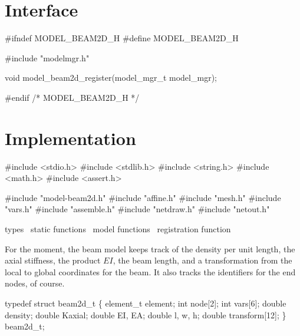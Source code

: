 \section{Interface}

\endmoddef
#ifndef MODEL_BEAM2D_H
#define MODEL_BEAM2D_H

#include "modelmgr.h"

void model_beam2d_register(model_mgr_t model_mgr);

#endif /* MODEL_BEAM2D_H */
\nwendcode{}\nwdocspar


\section{Implementation}

\nwenddocs{}\endmoddef
#include <stdio.h>
#include <stdlib.h>
#include <string.h>
#include <math.h>
#include <assert.h>

#include "model-beam2d.h"
#include "affine.h"
#include "mesh.h"
#include "vars.h"
#include "assemble.h"
#include "netdraw.h"
#include "netout.h"

\LA{}types~{\nwtagstyle{}}\RA{}
\LA{}static functions~{\nwtagstyle{}}\RA{}
\LA{}model functions~{\nwtagstyle{}}\RA{}
\LA{}registration function~{\nwtagstyle{}}\RA{}
\nwendcode{}\nwdocspar


For the moment, the beam model keeps track of the density per unit length,
the axial stiffness, the product $EI$, the beam length, and a transformation
from the local to global coordinates for the beam.  It also tracks the
identifiers for the end nodes, of course.

\nwenddocs{}\endmoddef
typedef struct beam2d_t \{
    element_t element;
    int node[2];
    int vars[6];
    double density;
    double Kaxial;
    double EI, EA;
    double l, w, h;
    double transform[12];
\} beam2d_t;

